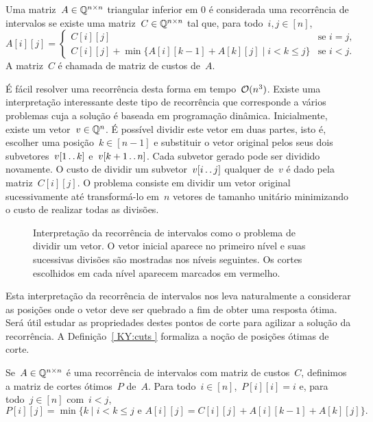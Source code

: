 \begin{defi} \label{ KY:recint }
Uma matriz~$A \in \mathbb{Q}^{n \times n}$ triangular inferior em 0 é considerada uma recorrência de intervalos se existe uma matriz~$C \in \mathbb{Q}^{n \times n}$ tal que, para todo~$i,j \in [n]$,
\begin{equation*}
A[i][j] = \begin{cases}
C[i][j]                                                           & \text{se } i = j \text{, }  \\
C[i][j] + \min\{A[i][k-1] + A[k][j] \mid i < k \leq j \}          & \text{se } i < j \text{.}
\end{cases}
\end{equation*}
A matriz~$C$ é chamada de matriz de custos de~$A$.
\end{defi}

É fácil resolver uma recorrência desta forma em tempo~$\mathcal{O}(n^3)$. Existe uma interpretação interessante deste tipo de recorrência que corresponde a vários problemas cuja a solução é baseada em programação dinâmica. Inicialmente, existe um vetor~$v \in \mathbb{Q}^n$. É possível dividir este vetor em duas partes, isto é, escolher uma posição~$k \in [n-1]$ e substituir o vetor original pelos seus dois subvetores~$v[1 \,.\,.\, k]$ e~$v[k+1 \,.\,.\, n]$. Cada subvetor gerado pode ser dividido novamente. O custo de dividir um subvetor~$v[i \,.\,.\, j]$ qualquer de~$v$ é dado pela matriz~$C[i][j]$. O problema consiste em dividir um vetor original sucessivamente até transformá-lo em~$n$ vetores de tamanho unitário minimizando o custo de realizar todas as divisões.

\begin{figure}[h]
    \centering
    
    \caption{Interpretação da recorrência de intervalos como o problema de dividir um vetor. O vetor inicial aparece no primeiro nível e suas sucessivas divisões são mostradas nos níveis seguintes. Os cortes escolhidos em cada nível aparecem marcados em vermelho.} \label{ KY:Interp }
\end{figure}

Esta interpretação da recorrência de intervalos nos leva naturalmente a considerar as posições onde o vetor deve ser quebrado a fim de obter uma resposta ótima. Será útil estudar as propriedades destes pontos de corte para agilizar a solução da recorrência. A Definição~\ref{ KY:cuts } formaliza a noção de posições ótimas de corte.

\begin{defi} \label{ KY:cuts }
Se~$A \in \mathbb{Q}^{n \times n}$ é uma recorrência de intervalos com matriz de custos~$C$, definimos a matriz de cortes ótimos~$P$ de~$A$. Para todo~$i \in [n]$,~$P[i][i] = i$ e, para todo~$j \in [n]$ com~$i < j$, 
$$P[i][j] = \min\{k \mid i < k \leq j \text{ e } A[i][j] = C[i][j] + A[i][k-1] + A[k][j]\} \text{.}$$
\end{defi}

